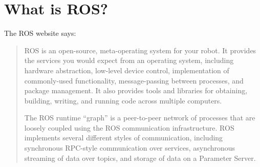 \documentclass{article}
\begin{document}




\section{What is ROS?}
The ROS website says:
\begin{quote}
ROS is an open-source, meta-operating system for your robot. It provides the services you would expect from an operating system, including hardware abstraction, low-level device control, implementation of commonly-used functionality, message-passing between processes, and package management. It also provides tools and libraries for obtaining, building, writing, and running code across multiple computers.

The ROS runtime ``graph'' is a peer-to-peer network of processes that are loosely coupled using the ROS communication infrastructure. ROS implements several different styles of communication, including synchronous RPC-style communication over services, asynchronous streaming of data over topics, and storage of data on a Parameter Server.
\end{quote}
\end{document}
